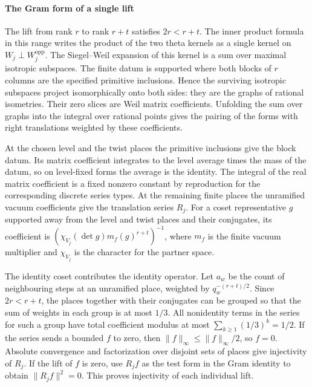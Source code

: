 \paragraph{The Gram form of a single lift}
The lift from rank \(r\) to rank \(r+t\) satisfies \(2r<r+t\).
The inner product formula in this range writes the product of the
two theta kernels as a single kernel on \(W_j\perp W_j^{\mathrm{opp}}\).
The Siegel--Weil expansion of this kernel is a sum over maximal
isotropic subspaces. The finite datum is supported where both blocks
of \(r\) columns are the specified primitive inclusions. Hence the
surviving isotropic subspaces project isomorphically onto both sides:
they are the graphs of rational isometries. Their zero slices are Weil
matrix coefficients. Unfolding the sum over graphs into the integral
over rational points gives the pairing of the forms with right
translations weighted by these coefficients.

At the chosen level and the twist places the primitive inclusions
give the block datum. Its matrix coefficient integrates to the level
average times the mass of the datum, so on level-fixed forms the
average is the identity. The integral of the real matrix coefficient
is a fixed nonzero constant by reproduction for the corresponding
discrete series types. At the remaining finite places the unramified
vacuum coefficients give the translation series \(R_j\).
For a coset representative \(g\) supported away from the level and
twist places and their conjugates, its coefficient is
\((\chi_{V_j}(\det g)m_f(g)^{r+t})^{-1}\),
where \(m_f\) is the finite vacuum multiplier and \(\chi_{V_j}\) is the
character for the partner space.

The identity coset contributes the identity operator. Let \(a_w\)
be the count of neighbouring steps at an unramified place, weighted
by \(q_w^{-(r+t)/2}\). Since \(2r<r+t\), the places together with their
conjugates can be grouped so that the sum of weights in each group
is at most \(1/3\). All nonidentity terms in the series for such a
group have total coefficient modulus at most
\(\sum_{k\ge1}(1/3)^k=1/2\).
If the series sends a bounded \(f\) to zero, then
\(\|f\|_\infty\le\|f\|_\infty/2\), so \(f=0\).
Absolute convergence and factorization over disjoint sets of places
give injectivity of \(R_j\). If the lift of \(f\) is zero, use \(R_j f\)
as the test form in the Gram identity to obtain \(\|R_j f\|^2=0\).
This proves injectivity of each individual lift.

